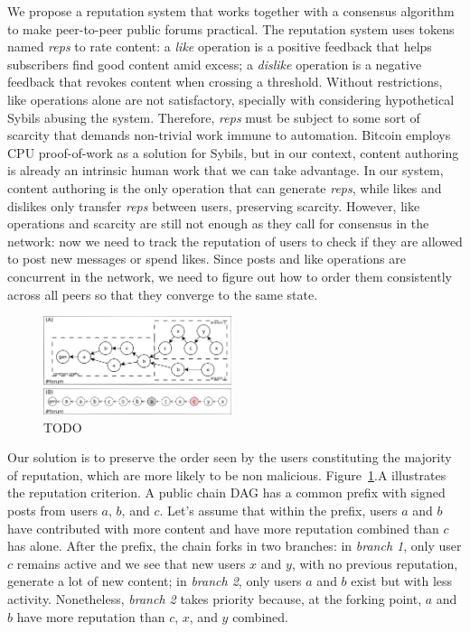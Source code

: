 \documentclass[10pt,journal,compsoc]{IEEEtran}
\newcommand{\reps} {\emph{reps}\xspace}
\begin{document}
We propose a reputation system that works together with a consensus algorithm
to make peer-to-peer public forums practical.
%
The reputation system uses tokens named \reps to rate content:
a \emph{like} operation is a positive feedback that helps subscribers find good
content amid excess;
a \emph{dislike} operation is a negative feedback that revokes content when
crossing a threshold.
%
Without restrictions, like operations alone are not satisfactory, specially
with considering hypothetical Sybils abusing the system.
Therefore, \reps must be subject to some sort of scarcity that demands
non-trivial work immune to automation.
Bitcoin employs CPU proof-of-work as a solution for Sybils, but in our context,
content authoring is already an intrinsic human work that we can take
advantage.
In our system, content authoring is the only operation that can generate \reps,
while likes and dislikes only transfer \reps between users, preserving
scarcity.
%
However, like operations and scarcity are still not enough as they call for
consensus in the network: now we need to track the reputation of users to check
if they are allowed to post new messages or spend likes.
Since posts and like operations are concurrent in the network, we need to
figure out how to order them consistently across all peers so that they
converge to the same state.

\begin{figure}[t]
\centering
\includegraphics[width=0.49\textwidth]{reps2.png}
\caption{TODO}
\label{fig.reps}
\end{figure}

Our solution is to preserve the order seen by the users constituting the
majority of reputation, which are more likely to be non malicious.
%
Figure~\ref{fig.reps}.A illustrates the reputation criterion.
A public chain DAG has a common prefix with signed posts from users $a$, $b$,
and $c$.
Let's assume that within the prefix, users $a$ and $b$ have contributed with
more content and have more reputation combined than $c$ has alone.
%
After the prefix, the chain forks in two branches:
in \emph{branch 1}, only user $c$ remains active and we see that new users $x$
and $y$, with no previous reputation, generate a lot of new content;
in \emph{branch 2}, only users $a$ and $b$ exist but with less activity.
Nonetheless, \emph{branch 2} takes priority because, at the forking point, $a$
and $b$ have more reputation than $c$, $x$, and $y$ combined.
\end{document}
